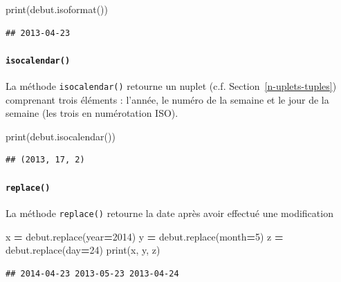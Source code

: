 \documentclass[12pt,]{book}
\newenvironment{Shaded}{\begin{snugshade}}{\end{snugshade}}
\newcommand{\DecValTok}[1]{\textcolor[rgb]{0.00,0.00,0.81}{#1}}
\newcommand{\OperatorTok}[1]{\textcolor[rgb]{0.81,0.36,0.00}{\textbf{#1}}}
\newcommand{\BuiltInTok}[1]{#1}
\newcommand{\NormalTok}[1]{#1}
\let\oldparagraph\paragraph
\renewcommand{\paragraph}[1]{\oldparagraph{#1}\mbox{}}
\numberwithin{equation}{section}
\numberwithin{countremarque}{section}
\begin{document}
\begin{Shaded}
\begin{Highlighting}[]
\BuiltInTok{print}\NormalTok{(debut.isoformat())}
\end{Highlighting}
\end{Shaded}

\begin{lstlisting}
## 2013-04-23
\end{lstlisting}

\paragraph{\texorpdfstring{\texttt{isocalendar()}}{isocalendar()}}\label{isocalendar}

La méthode \texttt{isocalendar()} retourne un nuplet (c.f.
Section~\ref{n-uplets-tuples}) comprenant trois éléments : l'année, le
numéro de la semaine et le jour de la semaine (les trois en numérotation
ISO).

\begin{Shaded}
\begin{Highlighting}[]
\BuiltInTok{print}\NormalTok{(debut.isocalendar())}
\end{Highlighting}
\end{Shaded}

\begin{lstlisting}
## (2013, 17, 2)
\end{lstlisting}

\paragraph{\texorpdfstring{\texttt{replace()}}{replace()}}\label{replace}

La méthode \texttt{replace()} retourne la date après avoir effectué une
modification

\begin{Shaded}
\begin{Highlighting}[]
\NormalTok{x }\OperatorTok{=}\NormalTok{ debut.replace(year}\OperatorTok{=}\DecValTok{2014}\NormalTok{)}
\NormalTok{y }\OperatorTok{=}\NormalTok{ debut.replace(month}\OperatorTok{=}\DecValTok{5}\NormalTok{)}
\NormalTok{z }\OperatorTok{=}\NormalTok{ debut.replace(day}\OperatorTok{=}\DecValTok{24}\NormalTok{)}
\BuiltInTok{print}\NormalTok{(x, y, z)}
\end{Highlighting}
\end{Shaded}

\begin{lstlisting}
## 2014-04-23 2013-05-23 2013-04-24
\end{lstlisting}
\end{document}
